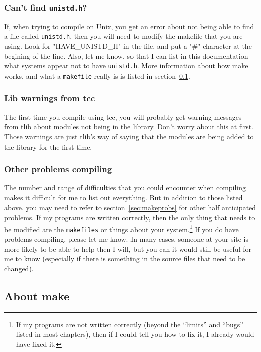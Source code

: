 \documentclass[%
	11pt,
        a4paper,
        twoside]{workrep}
\newcommand*{\prg}[1]{\textsf{#1}}		%
\newcommand*{\file}[1]{\texttt{#1}}		%
\begin{document}
\subsubsection{Can't find \file{unistd.h}?}

If, when trying to compile on Unix, you get an error about not being able
to find a file called \file{unistd.h}, then you will need to
modify the makefile that you are using.  Look for "HAVE_UNISTD_H"
in the file, and put a "#" character at the begining of the line.
Also, let me know, so that I can list in this documentation
what systems appear not to have \file{unistd.h}.  More information
about how \prg{make} works, and what a \file{makefile} really
is is listed in section~\ref{sec:moremake}.

\subsubsection{Lib warnings from \prg{tcc}}

The first time you compile using \prg{tcc}, you will probably get
warning messages from \prg{tlib} about modules not being in
the library.  Don't worry about this at first.  Those warnings
are just \prg{tlib}'s way of saying that the modules are being
added to the library for the first time.

\subsubsection{Other problems compiling}

The number and range of difficulties that you could encounter when
compiling makes it difficult for me to list out everything.  But
in addition to those listed above, you may need to refer to
section~\ref{sec:makeprobs} for other half anticipated problems.
If my programs are written correctly,
then the only thing that needs to be modified are the \file{makefiles}
or things about your system.\footnote{%
  If my programs are not written correctly (beyond the ``limits'' and ``bugs''
  listed in most chapters), then if I could tell you how to fix it, I
  already would have fixed it.}
If you do have problems compiling, please let me know.  In many cases,
someone at your site is more likely to be able to help then I will,
but you can it would still be useful for me to know (especially if there
is something in the source files that need to be changed).

\subsection{About \prg{make}}\label{sec:moremake}
\end{document}
